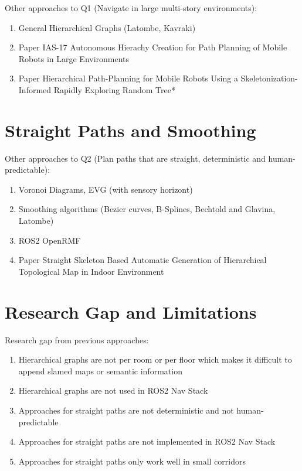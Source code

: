 Other approaches to Q1 (Navigate in large multi-story environments):
\begin{enumerate}
    \item General Hierarchical Graphs (Latombe, Kavraki)
    \item Paper IAS-17 Autonomous Hierachy Creation for Path Planning of Mobile Robots in Large Environments
    \item Paper Hierarchical Path-Planning for Mobile Robots Using a Skeletonization-Informed Rapidly Exploring Random Tree*
\end{enumerate}

\section{Straight Paths and Smoothing}
\label{sec:straight_paths}

Other approaches to Q2 (Plan paths that are straight, deterministic and human-predictable):

\begin{enumerate}
    \item Voronoi Diagrams, EVG (with sensory horizont)
    \item Smoothing algorithms (Bezier curves, B-Splines, Bechtold and Glavina, Latombe)
    \item ROS2 OpenRMF
    \item Paper Straight Skeleton Based Automatic Generation of Hierarchical Topological Map in Indoor Environment
\end{enumerate}

\section{Research Gap and Limitations}
\label{sec:research_gap}

Research gap from previous approaches:
\begin{enumerate}
    \item Hierarchical graphs are not per room or per floor which makes it difficult to append slamed maps or semantic information
    \item Hierarchical graphs are not used in ROS2 Nav Stack
    \item Approaches for straight paths are not deterministic and not human-predictable
    \item Approaches for straight paths are not implemented in ROS2 Nav Stack
    \item Approaches for straight paths only work well in small corridors
\end{enumerate}